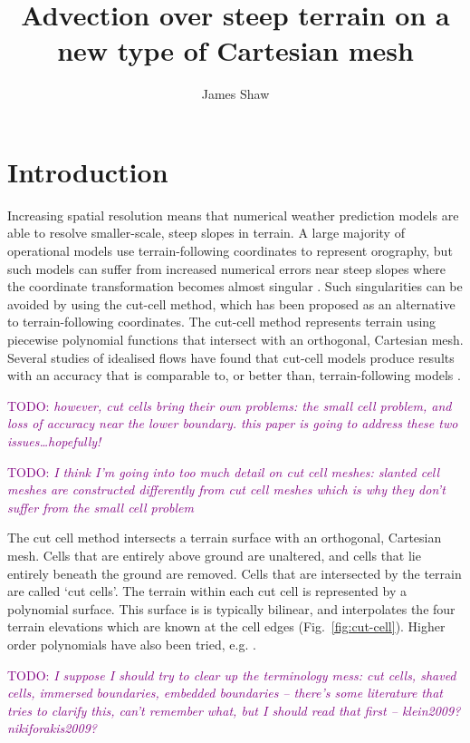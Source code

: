 \documentclass{article}
\title{Advection over steep terrain on a new type of Cartesian mesh \\ \TODO{(working title)}}
\author{James Shaw}
\newcommand{\TODO}[1]{\textcolor{purple}{TODO: \emph{#1}}}
\begin{document}
\maketitle

\section{Introduction}

Increasing spatial resolution means that numerical weather prediction models are able to resolve smaller-scale, steep slopes in terrain.  A large majority of operational models use terrain-following coordinates to represent orography, but such models can suffer from increased numerical errors near steep slopes where the coordinate transformation becomes almost singular \citep{nikiforakis2009}.  Such singularities can be avoided by using the cut-cell method, which has been proposed as an alternative to terrain-following coordinates.  The cut-cell method represents terrain using piecewise polynomial functions that intersect with an orthogonal, Cartesian mesh.  Several studies of idealised flows have found that cut-cell models produce results with an accuracy that is comparable to, or better than, terrain-following models \citep{yamazaki-satomura2008,good2014,shaw-weller2016}.


\TODO{however, cut cells bring their own problems: the small cell problem, and loss of accuracy near the lower boundary.  this paper is going to address these two issues\ldots hopefully!}


\TODO{I think I'm going into too much detail on cut cell meshes: slanted cell meshes are constructed differently from cut cell meshes which is why they don't suffer from the small cell problem}

The cut cell method intersects a terrain surface with an orthogonal, Cartesian mesh.
Cells that are entirely above ground are unaltered, and cells that lie entirely beneath the ground are removed.
Cells that are intersected by the terrain are called `cut cells'.  The terrain within each cut cell is represented by a polynomial surface.  This surface is is typically bilinear, and interpolates the four terrain elevations which are known at the cell edges (Fig.~\ref{fig:cut-cell}).  Higher order polynomials have also been tried, e.g. \citet{kirkpatrick2003}.

\TODO{I suppose I should try to clear up the terminology mess: cut cells, shaved cells, immersed boundaries, embedded boundaries -- there's some literature that tries to clarify this, can't remember what, but I should read that first -- klein2009? nikiforakis2009?}
\end{document}
